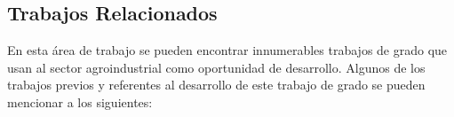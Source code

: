 




\subsection{Trabajos Relacionados}
En esta área de trabajo se pueden encontrar innumerables trabajos de grado que usan al sector agroindustrial como oportunidad de desarrollo. Algunos de los trabajos previos y referentes al desarrollo de este trabajo de grado se pueden mencionar a los siguientes:

